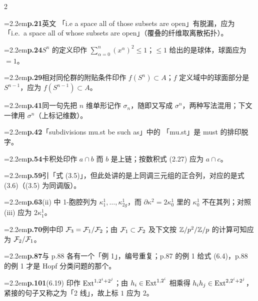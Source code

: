 \small
\begin{multicols}{2}
\raggedright

\noindent\hangindent=2.2em\textbf{p.21}\quad 英文 「i.e a space all of those subsets are open」有脱漏，应为 「i.e.\ a space all of whose subsets are open」（覆叠的纤维取离散拓扑）。\par

\noindent\hangindent=2.2em\textbf{p.24}\quad $S^n$ 的定义印作 $\sum_{\alpha=0}^{n}(x^\alpha)^2\le1$；$\le1$ 给出的是球体，球面应为 $=1$。\par

\noindent\hangindent=2.2em\textbf{p.29}\quad 相对同伦群的附贴条件印作 $f(S^n)\subset A$；$f$ 定义域中的球面部分是 $S^{n-1}$，应为 $f(S^{n-1})\subset A$。\par

\noindent\hangindent=2.2em\textbf{p.41}\quad 同一句先把 $n$ 维单形记作 $\sigma_n$，随即又写成 $\sigma^n$，两种写法混用；下文一律用 $\sigma^n$（上标记维数）。\par

\noindent\hangindent=2.2em\textbf{p.42}\quad 「subdivisions mu.st be such as」中的 「mu.st」是 must 的排印脱字。\par

\noindent\hangindent=2.2em\textbf{p.54}\quad 卡积处印作 $a\cap b$ 而 $b$ 是上链；按数积式 (2.27) 应为 $a\cap c$。\par

\noindent\hangindent=2.2em\textbf{p.59}\quad 引「式 (3.5)」，但此处讲的是上同调三元组的正合列，对应的是式 (3.6)（(3.5) 为同调版）。\par

\noindent\hangindent=2.2em\textbf{p.63}\quad (ii) 中 1-胞腔列为 $\kappa_1^1,\ldots,\kappa_{2g}^1$，而 $\partial\kappa^2=2\kappa_0^1$ 里的 $\kappa_0^1$ 不在其列；对照 (iii) 应为 $2\kappa_1^1$。\par

\noindent\hangindent=2.2em\textbf{p.70}\quad 例中印 $\mathcal{F}_3=\mathcal{F}_1/\mathcal{F}_2$；由 $\mathcal{F}_1\subset\mathcal{F}_2$ 及下文按 $\mathbb{Z}/p^2/\mathbb{Z}/p$ 的计算可知应为 $\mathcal{F}_2/\mathcal{F}_1$。\par

\noindent\hangindent=2.2em\textbf{p.87}\quad 与 p.88 各有一个「例 1」，编号重复；p.87 的例 1 给式 (6.4)，p.88 的例 1 才是 Hopf 分类问题的那个。\par

\noindent\hangindent=2.2em\textbf{p.101}\quad (6.19) 印作 $\operatorname{Ext}^{1,2^i+2^j}$；由 $h_i\in\operatorname{Ext}^{1,2^i}$ 相乘得 $h_ih_j\in\operatorname{Ext}^{2,2^i+2^j}$，紧接的句子又称之为「2 线」，故上标 $1$ 应为 $2$。\par


\end{multicols}
